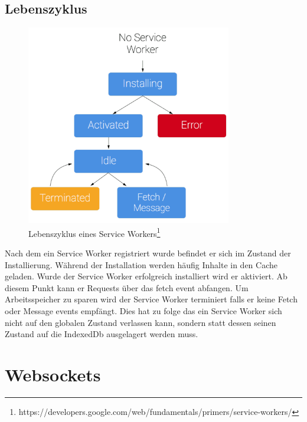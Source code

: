 \subsection{Lebenszyklus}
\begin{figure}[!h]
	\centering
	\includegraphics[width=0.8\textwidth]{figures/sw-lifecycle}
	\caption[A Figure Short-Title]{Lebenszyklus eines Service Workers\footnote{https://developers.google.com/web/fundamentals/primers/service-workers/}}
	\label{fig:swLifecycle}
\end{figure}
Nach dem ein Service Worker registriert wurde befindet er sich im Zustand der Installierung. Während der Installation werden häufig Inhalte in den Cache geladen. Wurde der Service Worker erfolgreich installiert wird er aktiviert. Ab diesem Punkt kann er Requests über das fetch event abfangen. Um Arbeitsspeicher zu sparen wird der Service Worker terminiert falls er keine Fetch oder Message events empfängt. Dies hat zu folge das ein Service Worker sich nicht auf den globalen Zustand verlassen kann, sondern statt dessen seinen Zustand auf die IndexedDb ausgelagert werden muss.



%


\section{Websockets}


